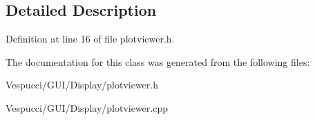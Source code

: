 \subsection{Detailed Description}


Definition at line 16 of file plotviewer.\+h.



The documentation for this class was generated from the following files\+:\begin{DoxyCompactItemize}
\item 
Vespucci/\+G\+U\+I/\+Display/plotviewer.\+h\item 
Vespucci/\+G\+U\+I/\+Display/plotviewer.\+cpp\end{DoxyCompactItemize}
